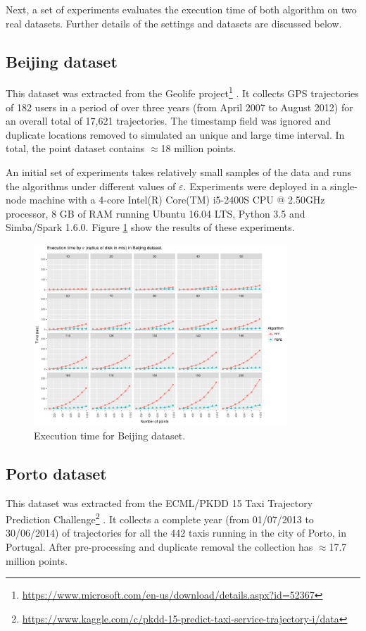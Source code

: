 \documentclass[12pt]{scrartcl}
\begin{document}
Next, a set of experiments evaluates the execution time of both algorithm on two real datasets.  Further details of the settings and datasets are discussed below.

\subsection{Beijing dataset}
This dataset was extracted from the Geolife project\footnote{\url{https://www.microsoft.com/en-us/download/details.aspx?id=52367}} \cite{zheng_understanding_2008, zheng_mining_2009, zheng_geolife:_2010}.  It collects GPS trajectories of 182 users in a period of over three years (from April 2007 to August 2012) for an overall total of 17,621 trajectories.  The timestamp field was ignored and duplicate locations removed to simulated an unique and large time interval.  In total, the point dataset contains $\approx$18 million points.

An initial set of experiments takes relatively small samples of the data and runs the algorithms under different values of $\varepsilon$. Experiments were deployed in a single-node machine with a 4-core Intel(R) Core(TM) i5-2400S CPU @ 2.50GHz processor, 8 GB of RAM running Ubuntu 16.04 LTS, Python 3.5 and Simba/Spark 1.6.0.  Figure \ref{fig:beijing} show the results of these experiments.

\begin{figure}
 \centering
 \includegraphics[width=0.85\textwidth]{figures/beijing} 
 \caption{Execution time for Beijing dataset.}
 \label{fig:beijing}
\end{figure}

\subsection{Porto dataset}
This dataset was extracted from the ECML/PKDD 15 Taxi Trajectory Prediction Challenge\footnote{\url{https://www.kaggle.com/c/pkdd-15-predict-taxi-service-trajectory-i/data}} \cite{lam_blue_2015, moreira-matias_predicting_2013}.  It collects a complete year (from 01/07/2013 to 30/06/2014) of trajectories for all the 442 taxis running in the city of Porto, in Portugal. After pre-processing and duplicate removal the collection has $\approx$17.7 million points.
\end{document}
